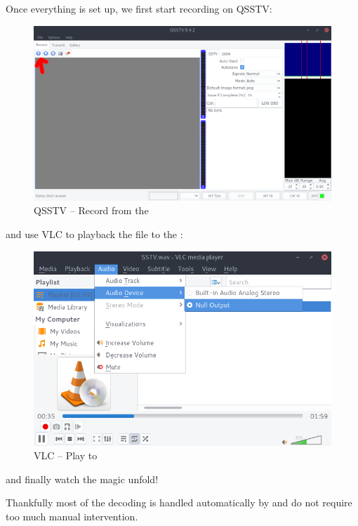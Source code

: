 		Once everything is set up, we first start recording on QSSTV:
		
		\begin{figure}[!htbp]
			\centering
			\includegraphics[width=130mm, frame]{figures/sstv/record.png} \vspace{5mm}
			\caption{QSSTV -- Record from the }
		\end{figure}
		
		and use VLC to playback the  file to the :
		
		\begin{figure}[!htbp]
			\centering
			\includegraphics[width=130mm, frame]{figures/sstv/vlc.png} \vspace{5mm}
			\caption{VLC -- Play to }
		\end{figure}		
		
		and finally watch the magic unfold!
		
		Thankfully most of the decoding is handled automatically by  and do not require too much manual intervention. 

